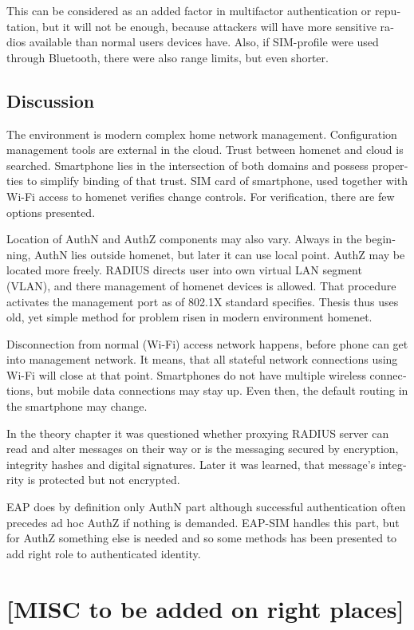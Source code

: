 \documentclass[12pt,a4paper,english]{tutthesis}
\begin{document}
\begin{otherlanguage}{english}
This can be considered as an added factor in multifactor
authentication or reputation, but it will not be enough, because
attackers will have more sensitive  radios available than normal users
devices have. 
Also, if SIM-profile were used through Bluetooth, there were also
range limits, but even shorter.


\section{Discussion}
\label{sec-6-10}

The environment is modern complex home network management.
Configuration management tools are 
external in the cloud. Trust between homenet and cloud is searched.
Smartphone lies in the intersection of both domains 
and possess properties to simplify binding of that trust.
SIM card of smartphone, used together with Wi-Fi access to homenet 
verifies change controls. For verification, there are few options presented.

Location of AuthN and AuthZ components may also vary.
Always in the beginning, AuthN lies outside homenet, but
later it can use local point. AuthZ may be located more freely.
RADIUS directs user into own virtual LAN segment (VLAN),
and there management of homenet devices is allowed.
That procedure activates the management port as of 802.1X standard
specifies.
Thesis thus uses old, yet simple method for problem risen in modern environment homenet.

Disconnection from normal (Wi-Fi) access network happens, before phone can get
into management network. It means, that all stateful network
connections using Wi-Fi will close at that point. Smartphones do not
have multiple wireless connections, but mobile data connections may 
stay up. Even then, the default routing in the smartphone may change.

In the theory chapter it was questioned whether proxying RADIUS server
can read and alter messages on their way or is the messaging secured
by encryption, integrity hashes and digital signatures.
Later it was learned, that message's integrity is protected but not encrypted.

EAP does by definition only AuthN part although successful
authentication often precedes ad hoc AuthZ if nothing is demanded.
EAP-SIM handles this part, but for AuthZ something else is needed
and so some methods has been presented to add right role to 
authenticated identity.
\chapter{[MISC to be added on right places]}
\label{sec-7}

\end{otherlanguage}
\end{document}
